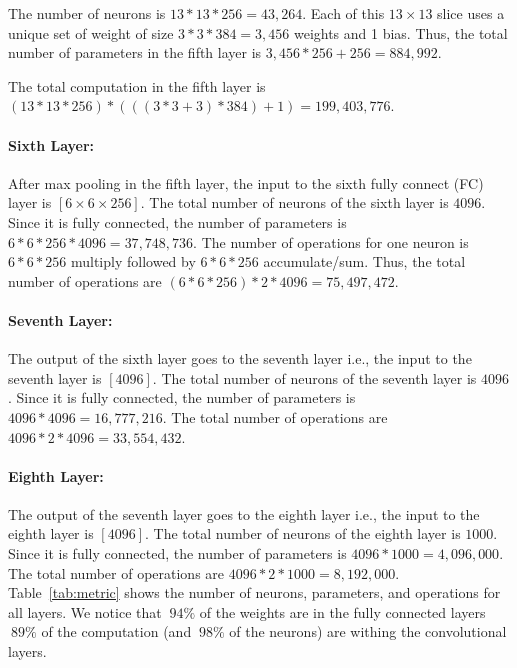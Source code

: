 \documentclass[12pt] {article}
\begin{document}
The number of neurons is $13*13*256 =43,264$. Each of this $13\times 13$ slice uses a unique set of weight of size $3*3*384=3,456$ weights and 1 bias. Thus, the total number of parameters in the fifth layer is $3,456*256+256=884,992$. 

The total computation in the fifth layer is $(13*13*256)*\left(  \left( (3*3+3)*384 \right)+1 \right) = 199,403,776$. 

\paragraph{Sixth Layer:} After max pooling in the fifth layer, the input to the sixth fully connect (FC) layer is $[6\times 6\times 256]$. The total number of neurons of the sixth layer is $4096$. Since it is fully connected, the number of parameters is $6*6*256*4096 = 37,748,736$. The number of operations for one neuron is $6*6*256$ multiply followed by $6*6*256$ accumulate/sum. Thus, the total number of operations are $(6*6*256)*2*4096=75,497,472$.



\paragraph{Seventh Layer:} The output of the sixth layer goes to the seventh layer i.e., the input to the seventh layer is $[4096]$. The total number of neurons of the seventh layer is $4096$. Since it is fully connected, the number of parameters is $4096*4096 = 16,777,216$. The total number of operations are $4096*2*4096= 33,554,432$.




\paragraph{Eighth Layer:} The output of the seventh layer goes to the eighth layer i.e., the input to the eighth layer is $[4096]$. The total number of neurons of the eighth layer is $1000$. Since it is fully connected, the number of parameters is $4096*1000 = 4,096,000$. The total number of operations are $4096*2*1000= 8,192,000$.
\\


Table~\ref{tab:metric} shows the number of neurons, parameters, and operations for all layers. We notice that $~94\%$ of the weights are in the fully connected layers $~89\%$ of the computation (and $~98\%$ of the neurons) are withing the convolutional layers.
\end{document}

